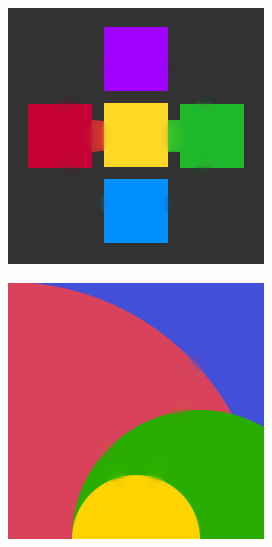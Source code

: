 \documentclass[xcolor=dvipsnames, xetex,serif]{beamer}
\begin{document}
\begin{frame}
\begin{figure}[H]
\begin{subfigure}{0.15\linewidth}
            \end{subfigure}
            \begin{subfigure}{0.15\linewidth}
                \centering
                \includegraphics[width=0.9\linewidth]{images/result_ex1/fixpoint04.png}
            \end{subfigure}
            \begin{subfigure}{0.15\linewidth}
                \centering
                \includegraphics[width=0.9\linewidth]{images/result_ex1/fixpoint05.png}

\end{subfigure}
\end{figure}
\end{frame}
\end{document}
